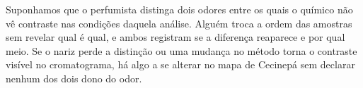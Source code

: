 Suponhamos que o perfumista distinga dois odores entre os quais o químico não vê contraste nas condições daquela análise. Alguém troca a ordem das amostras sem revelar qual é qual, e ambos registram se a diferença reaparece e por qual meio. Se o nariz perde a distinção ou uma mudança no método torna o contraste visível no cromatograma, há algo a se alterar no mapa de Cecinepá sem declarar nenhum dos dois dono do odor.
